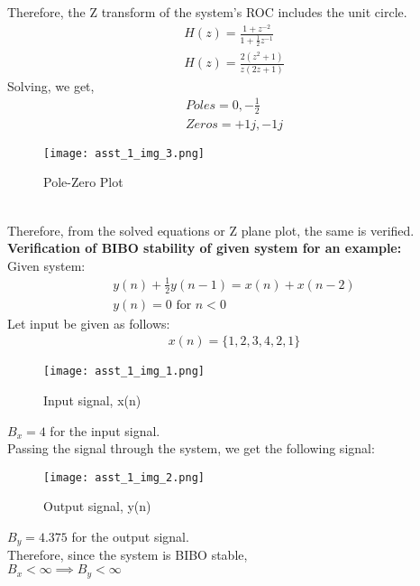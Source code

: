 \documentclass[journal,12pt,twocolumn]{IEEEtran}
\begin{document}
Therefore, the Z transform of the system's ROC includes the unit circle. \\
\begin{align}
    H(z) = \frac{1+z^{-2}}{1+\frac{1}{2}z^{-1}} \\
    H(z) = \frac{2(z^2+1)}{z(2z+1)} 
\end{align}
Solving, we get, \\
\begin{align}
    Poles = 0 , -\frac{1}{2} \\
    Zeros = +1j, -1j
\end{align}

\begin{figure}[h!]
    \centering
    \texttt{[image: asst\_1\_img\_3.png]}
    \caption{Pole-Zero Plot}
\end{figure}\\
Therefore, from the solved equations or Z plane plot, the same is verified. \\

\textbf{Verification of BIBO stability of given system for an example:} \\
Given system: 
\begin{align}
    y(n)+\frac{1}{2}y(n-1) = x(n)+x(n-2) \\
    y(n)=0 \text{ for }n<0
\end{align}
Let input be given as follows:
\begin{align}
    x(n)=\{1,2,3,4,2,1\}
\end{align}
\begin{figure}[h!]
    \centering
    \texttt{[image: asst\_1\_img\_1.png]}
    \caption{Input signal, x(n)}
\end{figure}
$B_x=4$ for the input signal. \\
Passing the signal through the system, we get the following signal: \\
\begin{figure}[h!]
    \centering
    \texttt{[image: asst\_1\_img\_2.png]}
    \caption{Output signal, y(n)}
\end{figure}
$B_y=4.375$ for the output signal. \\
Therefore, since the system is BIBO stable, \\
$B_x< \infty \implies B_y< \infty $
\end{document}
